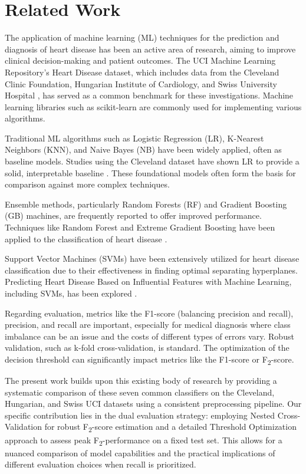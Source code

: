 \documentclass{article}
\begin{document}
\section{Related Work} %
\label{sec:related_work} %

The application of machine learning (ML) techniques for the prediction and diagnosis of heart disease has been an active area of research, aiming to improve clinical decision-making and patient outcomes. The UCI Machine Learning Repository's Heart Disease dataset, which includes data from the Cleveland Clinic Foundation, Hungarian Institute of Cardiology, and Swiss University Hospital \cite{UCIHeart}, has served as a common benchmark for these investigations. Machine learning libraries such as scikit-learn \cite{scikit-learn} are commonly used for implementing various algorithms.

Traditional ML algorithms such as Logistic Regression (LR), K-Nearest Neighbors (KNN), and Naive Bayes (NB) have been widely applied, often as baseline models. Studies using the Cleveland dataset have shown LR to provide a solid, interpretable baseline \cite{Paul2021}. These foundational models often form the basis for comparison against more complex techniques.

Ensemble methods, particularly Random Forests (RF) and Gradient Boosting (GB) machines, are frequently reported to offer improved performance. Techniques like Random Forest and Extreme Gradient Boosting have been applied to the classification of heart disease \cite{Pratama2023}.

Support Vector Machines (SVMs) have been extensively utilized for heart disease classification due to their effectiveness in finding optimal separating hyperplanes. Predicting Heart Disease Based on Influential Features with Machine Learning, including SVMs, has been explored \cite{Dubey2021}.

Regarding evaluation, metrics like the F1-score (balancing precision and recall), precision, and recall are important, especially for medical diagnosis where class imbalance can be an issue and the costs of different types of errors vary. Robust validation, such as k-fold cross-validation, is standard. The optimization of the decision threshold can significantly impact metrics like the F1-score or F\textsubscript{2}-score.

The present work builds upon this existing body of research by providing a systematic comparison of these seven common classifiers on the Cleveland, Hungarian, and Swiss UCI datasets using a consistent preprocessing pipeline. Our specific contribution lies in the dual evaluation strategy: employing Nested Cross-Validation for robust F\textsubscript{2}-score estimation and a detailed Threshold Optimization approach to assess peak F\textsubscript{2}-performance on a fixed test set. This allows for a nuanced comparison of model capabilities and the practical implications of different evaluation choices when recall is prioritized. \cite{MCC}
\end{document}
